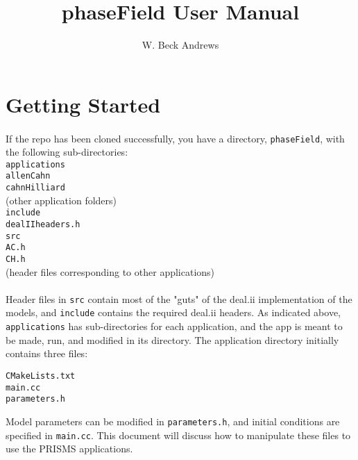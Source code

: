 \documentclass[11pt]{article} %
\title{phaseField User Manual}
\author{W. Beck Andrews}
\date{} %
\begin{document}
\maketitle

\section{Getting Started}
\paragraph{}
If the repo has been cloned successfully, you have a directory, \texttt{phaseField}, with the following sub-directories: \\
\texttt{applications} \\
\indent{} \texttt{allenCahn} \\
\indent{} \texttt{cahnHilliard} \\
\indent{} (other application folders) \\
\texttt{include} \\
\indent{} \texttt{dealIIheaders.h} \\
\texttt{src} \\
\indent{} \texttt{AC.h} \\
\indent{} \texttt{CH.h} \\
\indent{} (header files corresponding to other applications) \\
\paragraph{}
Header files in \texttt{src} contain most of the "guts" of the deal.ii implementation of the models, and \texttt{include} contains the required deal.ii headers.  As indicated above, \texttt{applications} has sub-directories for each application, and the app is meant to be made, run, and modified in its directory.  The application directory initially contains three files:
\begin{center}
\texttt{CMakeLists.txt}\\
\texttt{main.cc}\\
\texttt{parameters.h}
\end{center}
Model parameters can be modified in \texttt{parameters.h}, and initial conditions are specified in \texttt{main.cc}.  This document will discuss how to manipulate these files to use the PRISMS applications.

\end{document}
